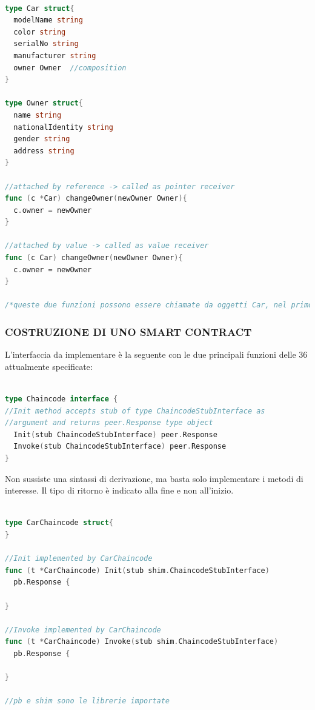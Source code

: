 \begin{lstlisting}[language=Go]

type Car struct{
  modelName string
  color string
  serialNo string
  manufacturer string
  owner Owner  //composition
}

type Owner struct{
  name string
  nationalIdentity string
  gender string
  address string
}

//attached by reference -> called as pointer receiver
func (c *Car) changeOwner(newOwner Owner){
  c.owner = newOwner
}

//attached by value -> called as value receiver
func (c Car) changeOwner(newOwner Owner){
  c.owner = newOwner
}

/*queste due funzioni possono essere chiamate da oggetti Car, nel primo caso da riferimenti a tipo Car, mentre nel secondo caso da oggetti di tipo Car. Nel primo caso le modifiche nel corpo del metodo si riflettono sul chiamante, mentre nel secondo caso viene effettuata una copia.*/

\end{lstlisting}

\subsubsection{COSTRUZIONE DI UNO SMART CONTRACT}

L'interfaccia da implementare è la seguente con le due principali funzioni delle 36 attualmente specificate:

\begin{lstlisting}[language=Go]

type Chaincode interface {
//Init method accepts stub of type ChaincodeStubInterface as
//argument and returns peer.Response type object
  Init(stub ChaincodeStubInterface) peer.Response
  Invoke(stub ChaincodeStubInterface) peer.Response
}

\end{lstlisting}
Non sussiste una sintassi di derivazione, ma basta solo implementare i metodi di interesse. Il tipo di ritorno è indicato alla fine e non all'inizio.
\begin{lstlisting}[language=Go]

type CarChaincode struct{
}

//Init implemented by CarChaincode
func (t *CarChaincode) Init(stub shim.ChaincodeStubInterface)
  pb.Response {
  
}

//Invoke implemented by CarChaincode
func (t *CarChaincode) Invoke(stub shim.ChaincodeStubInterface)
  pb.Response {
  
}

//pb e shim sono le librerie importate

\end{lstlisting}


